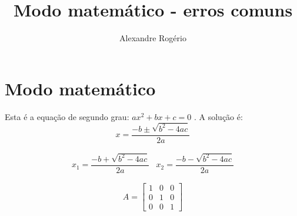 \documentclass{article}
\begin{document}
	
	\title{\textbf{{\Huge Modo matemático - erros comuns}}}
	\author{Alexandre Rogério}
	\maketitle
	\thispagestyle{empty} %
	\newpage
	
	\setcounter{page}{1}
	\tableofcontents
	\newpage
	
	\listoffigures
	\newpage
	
	\listoftables
	\newpage
	
	\setcounter{page}{1}
	
	\section{Modo matemático}
	Esta é a equação de segundo grau: $ ax^2 + bx + c = 0 $ . A solução é:
	\begin{equation*}
		x = \frac{-b \pm \sqrt{b^2 - 4ac}}{2a}
	\end{equation*}

	\begin{equation*}
		\begin{array}{cc}
			x_1 = \dfrac{-b + \sqrt{b^2 - 4ac}}{2a}	&
			x_2 = \dfrac{-b - \sqrt{b^2 - 4ac}}{2a}
		\end{array}
	\end{equation*}

	\begin{equation*}
		A = \begin{bmatrix}
			1 & 0 & 0 \\
			0 & 1 & 0 \\
			0 & 0 & 1
		\end{bmatrix}
	\end{equation*}
\end{document}
